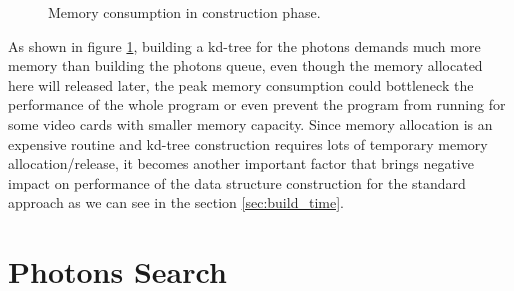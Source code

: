 \begin{figure}[ftp]
    \centering
    \renewcommand{\thefigure}{\thechapter.\arabic{figure}}
    \caption[Memory consumption in construction phase]{Memory consumption in construction phase. }
    \label{fig:memory_consumption_2}
\end{figure}

As shown in figure \ref{fig:memory_consumption_2}, building a kd-tree for the photons demands much more memory than building the photons queue, even though the memory allocated here will released later, the peak memory consumption could bottleneck the performance of the whole program or even prevent the program from running for some video cards with smaller memory capacity. Since memory allocation is an expensive routine and kd-tree construction requires lots of temporary memory allocation/release, it becomes another important factor that brings negative impact on performance of the data structure construction for the standard approach as we can see in the section \ref{sec:build_time}.

\section{Photons Search}

